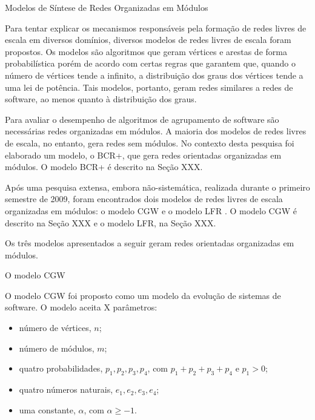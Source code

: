\begin{section}{Modelos de Síntese de Redes Organizadas em Módulos}

Para tentar explicar os mecanismos responsáveis pela formação de redes livres de escala em diversos domínios, diversos modelos de redes livres de escala foram propostos. Os modelos são algoritmos que geram vértices e arestas de forma probabilística porém de acordo com certas regras que garantem que, quando o número de vértices tende a infinito, a distribuição dos graus dos vértices tende a uma lei de potência. Tais modelos, portanto, geram redes similares a redes de software, ao menos quanto à distribuição dos graus.

Para avaliar o desempenho de algoritmos de agrupamento de software são necessárias redes organizadas em módulos. A maioria dos modelos de redes livres de escala, no entanto, gera redes sem módulos. No contexto desta pesquisa foi elaborado um modelo, o BCR+, que gera redes orientadas organizadas em módulos. O modelo BCR+ é descrito na Seção XXX.

Após uma pesquisa extensa, embora não-sistemática, realizada durante o primeiro semestre de 2009, foram encontrados dois modelos de redes livres de escala organizadas em módulos: o modelo CGW \cite{Chen2008} e o modelo LFR \cite{Lancichinetti2009}. O modelo CGW é descrito na Seção XXX e o modelo LFR, na Seção XXX.

Os três modelos apresentados a seguir geram redes orientadas organizadas em módulos. 


\begin{subsection}{O modelo CGW}

O modelo CGW \cite{Chen2008} foi proposto como um modelo da evolução de sistemas de software. O modelo aceita X parâmetros:

\begin{itemize}
\item número de vértices, $n$;
\item número de módulos, $m$;
\item quatro probabilidades, $p_1, p_2, p_3, p_4$, com $p_1 + p_2 + p_3 + p_4$ e $p_1 > 0$;
\item quatro números naturais, $e_1, e_2, e_3, e_4$;
\item uma constante, $\alpha$, com $\alpha \ge -1$.
\end{itemize}


\end{subsection}
\end{section}
